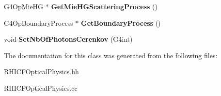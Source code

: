 \begin{DoxyCompactItemize}
\item 
\hypertarget{class_r_h_i_c_f_optical_physics_ac23aac998b7b4460a8d4da6aae7ae32d}{}G4\+Op\+Mie\+H\+G $\ast$ {\bfseries Get\+Mie\+H\+G\+Scattering\+Process} ()\label{class_r_h_i_c_f_optical_physics_ac23aac998b7b4460a8d4da6aae7ae32d}

\item 
\hypertarget{class_r_h_i_c_f_optical_physics_a50c493d6ed4ddf5e5ef4282932f18542}{}G4\+Op\+Boundary\+Process $\ast$ {\bfseries Get\+Boundary\+Process} ()\label{class_r_h_i_c_f_optical_physics_a50c493d6ed4ddf5e5ef4282932f18542}

\item 
\hypertarget{class_r_h_i_c_f_optical_physics_a75bcc20717f634aba7bc760c938e91c9}{}void {\bfseries Set\+Nb\+Of\+Photons\+Cerenkov} (G4int)\label{class_r_h_i_c_f_optical_physics_a75bcc20717f634aba7bc760c938e91c9}

\end{DoxyCompactItemize}


The documentation for this class was generated from the following files\+:\begin{DoxyCompactItemize}
\item 
R\+H\+I\+C\+F\+Optical\+Physics.\+hh\item 
R\+H\+I\+C\+F\+Optical\+Physics.\+cc\end{DoxyCompactItemize}
